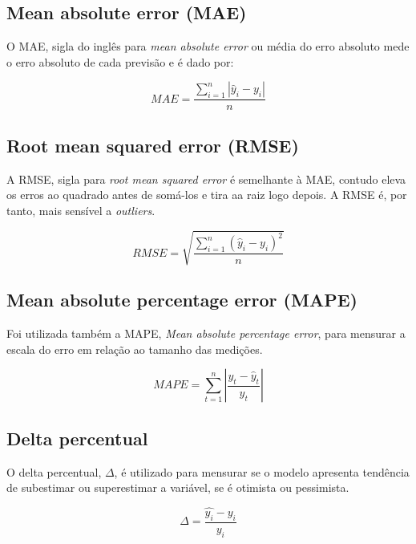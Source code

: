\subsection{Mean absolute error (MAE)}

    O MAE, sigla do inglês para \textit{mean absolute error}
    ou média do erro absoluto mede o erro absoluto de cada previsão
    e é dado por:\cite{forecast-evaluation-ds}

    \begin{equation}
        MAE = \frac{\sum_{i=1}^n |\hat{y}_i - y_i|}{n}
    \end{equation}

\subsection{Root mean squared error (RMSE)}

    A RMSE, sigla para \textit{root mean squared  error} é
    semelhante à MAE, contudo eleva os erros ao quadrado antes de 
    somá-los e tira aa raiz logo depois. A RMSE é, por tanto, 
    mais sensível a \textit{outliers}.\cite{forecast-evaluation-ds}

    \begin{equation}
        RMSE = \sqrt{\frac{\sum_{i=1}^n (\hat{y}_i - y_i)^2}{n}}
    \end{equation}

\subsection{Mean absolute percentage error (MAPE)}

    Foi utilizada também a MAPE, \textit{Mean absolute
    percentage error}, para mensurar a escala do erro em 
    relação ao tamanho das medições.

    \begin{equation}
        MAPE=\sum_{t=1}^n\left|\frac{y_t-\hat{y}_t}{y_t}\right|
    \end{equation}

\subsection{Delta percentual}

O delta percentual, $\Delta$, é utilizado para mensurar se o 
modelo apresenta tendência de subestimar ou superestimar a variável, se 
é otimista ou pessimista.

\begin{equation}
    \Delta = \frac{\hat{y_i} - y_i}{y_i}
\end{equation}